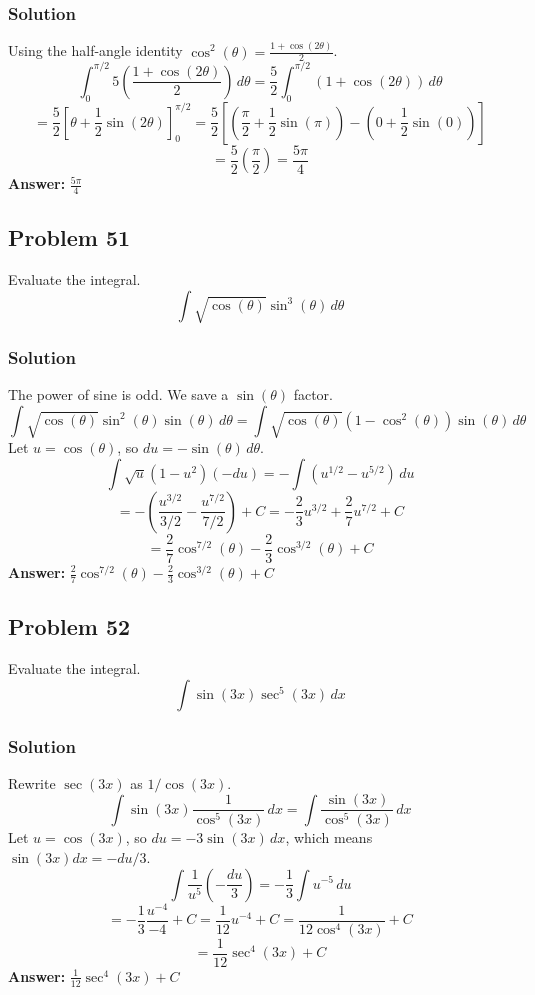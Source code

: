 \documentclass{article}
\begin{document}
\subsubsection*{Solution}
Using the half-angle identity $\cos^2(\theta) = \frac{1 + \cos(2\theta)}{2}$.
$$ \int_{0}^{\pi/2} 5 \left(\frac{1 + \cos(2\theta)}{2}\right) \,d\theta = \frac{5}{2} \int_{0}^{\pi/2} (1 + \cos(2\theta)) \,d\theta $$
$$ = \frac{5}{2} \left[ \theta + \frac{1}{2}\sin(2\theta) \right]_{0}^{\pi/2} = \frac{5}{2} \left[ (\frac{\pi}{2} + \frac{1}{2}\sin(\pi)) - (0 + \frac{1}{2}\sin(0)) \right] $$
$$ = \frac{5}{2} \left( \frac{\pi}{2} \right) = \frac{5\pi}{4} $$
\textbf{Answer:} $ \frac{5\pi}{4} $
\subsection{Problem 51}
Evaluate the integral.
$$ \int \sqrt{\cos(\theta)} \sin^3(\theta) \,d\theta $$
\subsubsection*{Solution}
The power of sine is odd. We save a $\sin(\theta)$ factor.
$$ \int \sqrt{\cos(\theta)} \sin^2(\theta) \sin(\theta) \,d\theta = \int \sqrt{\cos(\theta)} (1 - \cos^2(\theta)) \sin(\theta) \,d\theta $$
Let $u = \cos(\theta)$, so $du = -\sin(\theta) \,d\theta$.
$$ \int \sqrt{u} (1 - u^2) (-du) = -\int (u^{1/2} - u^{5/2}) \,du $$
$$ = - \left( \frac{u^{3/2}}{3/2} - \frac{u^{7/2}}{7/2} \right) + C = -\frac{2}{3}u^{3/2} + \frac{2}{7}u^{7/2} + C $$
$$ = \frac{2}{7}\cos^{7/2}(\theta) - \frac{2}{3}\cos^{3/2}(\theta) + C $$
\textbf{Answer:} $ \frac{2}{7}\cos^{7/2}(\theta) - \frac{2}{3}\cos^{3/2}(\theta) + C $
\subsection{Problem 52}
Evaluate the integral.
$$ \int \sin(3x) \sec^5(3x) \,dx $$
\subsubsection*{Solution}
Rewrite $\sec(3x)$ as $1/\cos(3x)$.
$$ \int \sin(3x) \frac{1}{\cos^5(3x)} \,dx = \int \frac{\sin(3x)}{\cos^5(3x)} \,dx $$
Let $u = \cos(3x)$, so $du = -3\sin(3x) \,dx$, which means $\sin(3x)dx = -du/3$.
$$ \int \frac{1}{u^5} \left(-\frac{du}{3}\right) = -\frac{1}{3} \int u^{-5} \,du $$
$$ = -\frac{1}{3} \frac{u^{-4}}{-4} + C = \frac{1}{12}u^{-4} + C = \frac{1}{12\cos^4(3x)} + C $$
$$ = \frac{1}{12}\sec^4(3x) + C $$
\textbf{Answer:} $ \frac{1}{12}\sec^4(3x) + C $
\end{document}
